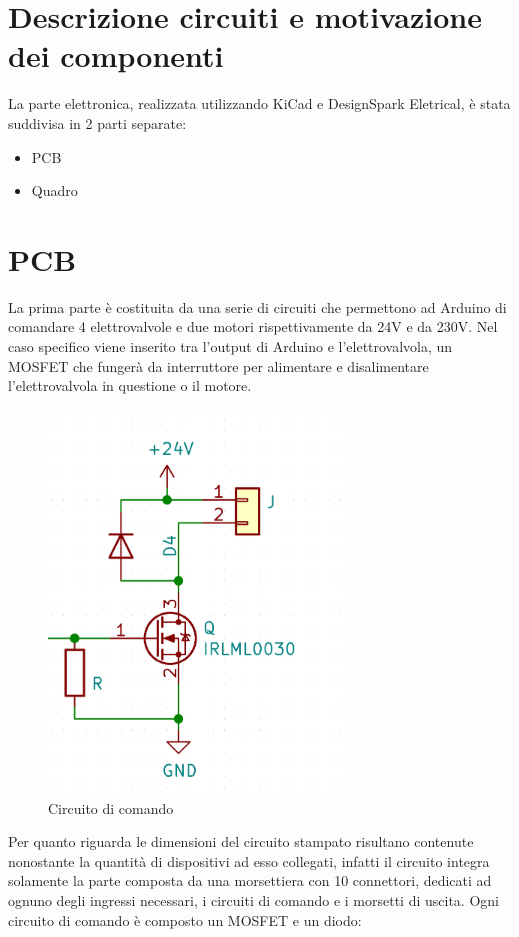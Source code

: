 \documentclass{report}
\begin{document}
\section{Descrizione circuiti e motivazione dei componenti}
La parte elettronica, realizzata utilizzando KiCad e DesignSpark Eletrical, è stata suddivisa in 2 parti separate:
\begin{itemize}
\item PCB
\item Quadro
\end{itemize}
\section{PCB}
La prima parte è costituita da una serie di circuiti che permettono ad Arduino di comandare 4 elettrovalvole e due motori rispettivamente da 24V e da 230V. Nel caso specifico viene inserito tra l'output di Arduino e l'elettrovalvola, un MOSFET che fungerà da interruttore per alimentare e disalimentare l'elettrovalvola in questione o il motore.
\begin{figure}[H]
  \centering
  \includegraphics[width=0.7\textwidth]{src/img/circuito_comando.png}
  \caption{Circuito di comando}
  \label{fig:circuito}
\end{figure}
Per quanto riguarda le dimensioni del circuito stampato risultano contenute nonostante la quantità di dispositivi ad esso collegati, infatti il circuito integra solamente la parte composta da una morsettiera con 10 connettori, dedicati ad ognuno degli ingressi necessari, i circuiti di comando e i morsetti di uscita. Ogni circuito di comando è composto un MOSFET e un diodo: 
\end{document}
